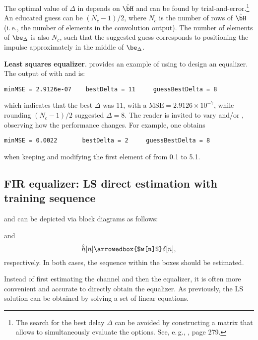 The optimal value of $\Delta$ in  depends on $\hat \bH$ and
can be found by trial-and-error.\footnote{The search for the best delay $\Delta$
can be avoided by constructing a matrix that allows to simultaneously evaluate the options. See, e.\,g., \cite{Johnson11}, page 279.} An educated guess can be $(N_c-1)/2$, where $N_c$ is the
number of rows of $\hat \bH$ (i.\,e., the number of elements in the convolution
output). The number of elements of $\be_{\Delta}$ is also $N_c$, such that the
suggested guess corresponds to positioning the impulse approximately in the
middle of $\be_{\Delta}$.

\bExample \textbf{Least squares equalizer}.
 provides an example of using  to design
an equalizer.
The output of  with  and  is:
\begin{verbatim}
minMSE = 2.9126e-07    bestDelta = 11     guessBestDelta = 8
\end{verbatim}
which indicates that the best $\Delta$ was 11, with a $\textrm{MSE}=2.9126 \times 10^{-7}$, while rounding
$(N_c-1)/2$ suggested $\Delta=8$. The reader is invited to vary  and/or , observing how the performance changes. For example, one obtains
\begin{verbatim}
minMSE = 0.0022       bestDelta = 2     guessBestDelta = 8
\end{verbatim}
when keeping  and modifying the first element of  from 0.1 to 5.1.
\eExample

\subsection{FIR equalizer: LS direct estimation with training sequence}

 and  can be depicted via block diagrams
as follows:

and
\begin{equation}
\hat h[n] \arrowedbox{$w[n]$} \delta[n],
\end{equation}
respectively. In both cases, the sequence within the boxes should be estimated.

Instead of first estimating the channel and then the equalizer, it is often more
convenient and accurate to directly obtain the equalizer. As previously, the LS solution 
can be obtained by solving a set of linear equations.

